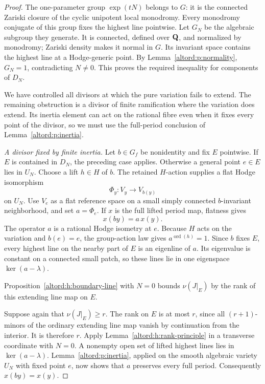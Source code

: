 \begin{proof}
The one-parameter group $\exp(tN)$ belongs to $G$: it is the
connected Zariski closure of the cyclic unipotent local monodromy.
Every monodromy conjugate of this group fixes the highest line
pointwise. Let $G_N$ be the algebraic subgroup they generate.
It is connected, defined over $\mathbf Q$, and normalized by monodromy;
Zariski density makes it normal in $G$. Its invariant space contains
the highest line at a Hodge-generic point. By
Lemma~\ref{altord:p:normality}, $G_N=1$, contradicting $N\ne0$.
This proves the required inequality for components of $D_N$.

We have controlled all divisors at which the pure variation fails
to extend. The remaining obstruction is a divisor of finite
ramification where the variation does extend. Its inertia element
can act on the rational fibre even when it fixes every point of
the divisor, so we must use the full-period conclusion of
Lemma~\ref{altord:p:inertia}.

\smallskip\noindent
\emph{A divisor fixed by finite inertia.}
Let $b\in G_f$ be nonidentity and fix $E$ pointwise. If $E$ is
contained in $D_N$, the preceding case applies. Otherwise a general
point $e\in E$ lies in $U_N$. Choose a lift $h\in H$ of $b$.
The retained $H$-action supplies a flat Hodge isomorphism
\[
                  \Phi_y:V_y\longrightarrow V_{b(y)}
\]
on $U_N$. Use $V_e$ as a flat reference space on a small simply
connected $b$-invariant neighborhood, and set $a=\Phi_e$.
If $x$ is the full lifted period map, flatness gives
\[
                             x(by)=a\,x(y).
\]
The operator $a$ is a rational Hodge isometry at $e$. Because $H$
acts on the variation and $b(e)=e$, the group-action law gives
$a^{\operatorname{ord}(h)}=1$. Since $b$ fixes $E$, every highest line
on the nearby part of $E$ is an eigenline of $a$. Its eigenvalue
is constant on a connected small patch, so these lines lie in one
eigenspace $\ker(a-\lambda)$.

Proposition~\ref{altord:h:boundary-line} with $N=0$ bounds
$\nu(J|_E)$ by the rank of this extending line map on $E$.

Suppose again that $\nu(J|_E)\geq r$. The rank on $E$ is at most
$r$, since all $(r+1)$-minors of the ordinary extending line map
vanish by continuation from the interior. It is therefore $r$.
Apply Lemma~\ref{altord:h:rank-principle} in a transverse coordinate
with $N=0$. A nonempty open set of lifted highest lines lies in
$\ker(a-\lambda)$. Lemma~\ref{altord:p:inertia}, applied on the
smooth algebraic variety $U_N$ with fixed point $e$, now shows
that $a$ preserves every full period. Consequently $x(by)=x(y)$.


\end{proof}
